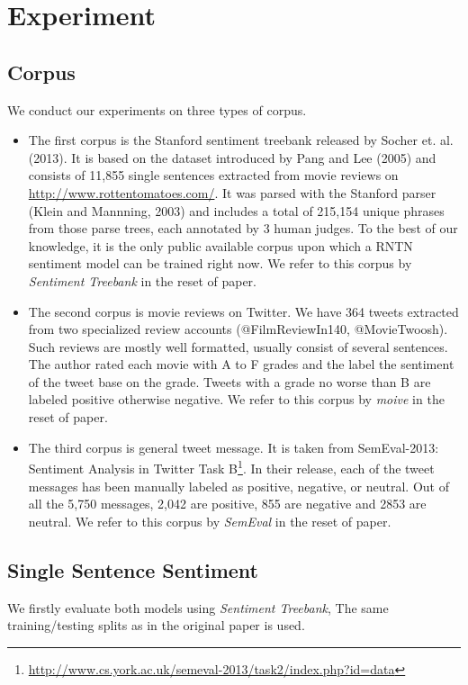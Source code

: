 \section{Experiment}
\label{sec:exp}


\subsection{Corpus}
We conduct our experiments on three types of corpus.
\begin{itemize}
\item  The first corpus is the Stanford sentiment treebank released by Socher et. al. (2013). It is based on the dataset introduced by Pang and Lee (2005) and consists of 11,855 single sentences extracted from movie reviews on \url{http://www.rottentomatoes.com/}. It was parsed with the Stanford parser (Klein and Mannning, 2003) and includes a total of 215,154 unique phrases from those parse trees, each annotated by 3 human judges. To the best of our knowledge, it is the only public available corpus upon which a RNTN sentiment model can be trained right now. We refer to this corpus by \textit{Sentiment Treebank} in the reset of paper. 

\item  The second corpus is movie reviews on Twitter. We have 364 tweets extracted from two specialized review accounts (@FilmReviewIn140, @MovieTwoosh). Such reviews are mostly well formatted, usually consist of several sentences. The author rated each movie with A to F grades and the label the sentiment of the tweet base on the grade. Tweets with a grade no worse than B are labeled positive otherwise negative.  We refer to this corpus by \textit{moive} in the reset of paper. 

\item The third corpus is general tweet message. It is taken from SemEval-2013: Sentiment Analysis in Twitter Task B\footnote{\url{http://www.cs.york.ac.uk/semeval-2013/task2/index.php?id=data}}. In their release, each of the tweet messages has been manually labeled as positive, negative, or neutral. Out of all the 5,750 messages, 2,042 are positive, 855 are negative and 2853 are neutral.  We refer to this corpus by \textit{SemEval} in the reset of paper. 
\end{itemize}

\subsection{Single Sentence Sentiment}
We firstly evaluate both models using \textit{Sentiment Treebank}, The same training/testing splits as in the original paper\cite{Socher:2013} is used. 

